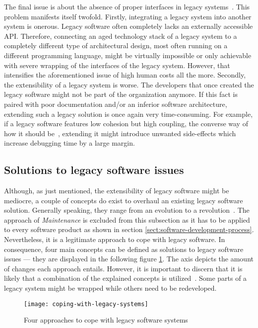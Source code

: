 \documentclass[12pt,a4paper]{report}
\begin{document}
The final issue is about the absence of proper interfaces
in legacy systems~\cite{bisbal-legacy-issues}. This problem manifests itself twofold.
Firstly, integrating a legacy system into another system is onerous.
Legacy software often completely lacks an externally accessible API.
Therefore, connecting an aged technology stack of a legacy system to a completely
different type of architectural design, most often running on a different programming language,
might be virtually impossible or only achievable with severe wrapping
of the interfaces of the legacy system. However, that intensifies the aforementioned
issue of high human costs all the more.
Secondly, the extensibility of a legacy system is worse.
The developers that once created the legacy software might not be part of the
organization anymore. If this fact is paired with poor documentation and/or
an inferior software architecture, extending such a legacy solution is once again
very time-consuming. For example, if a legacy software features
low cohesion but high coupling, the converse way of how it should be~\cn,
extending it might introduce unwanted side-effects which increase debugging
time by a large margin.


\subsection{Solutions to legacy software issues}

Although, as just mentioned, the extensibility of legacy software might be mediocre,
a couple of concepts do exist to overhaul an existing legacy software solution.
Generally speaking, they range from an evolution to a revolution~\cite{bisbal-legacy-issues}.
The approach of \textit{Maintenance} is excluded from this subsection as it
has to be applied to every software product as shown in section \ref{sect:software-development-process}.
Nevertheless, it is a legitimate approach to cope with legacy software.
In consequence, four main concepts can be defined as solutions to legacy software issues ---
they are displayed in the following figure \ref{fig:coping-legacy}.
The axis depicts the amount of changes each approach entails.
However, it is important to discern that it is likely that a combination of
the explained concepts is utilized~\cite{bisbal-legacy-issues}.
Some parts of a legacy system might be wrapped while others need to be redeveloped.
\begin{figure}[htbp]
\centering
\texttt{[image: coping-with-legacy-systems]}
\caption{Four approaches to cope with legacy software systems~\cite{bisbal-legacy-issues}}
\label{fig:coping-legacy}
\end{figure}
\end{document}
